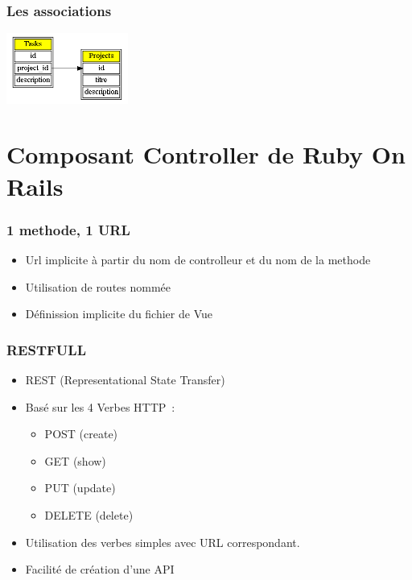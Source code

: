 \documentclass{beamer}
\begin{document}
\begin{frame}
    \frametitle{Les associations}
    \begin{center}
        \includegraphics[width=40mm]{project_task.png}
        
    \end{center}
\end{frame}


\section{Composant Controller de Ruby On Rails}

\begin{frame}
    \frametitle{1 methode, 1 URL}
    \begin{itemize}
        \item Url implicite à partir du nom de controlleur et du nom de la
        methode
        \item Utilisation de routes nommée
        \item Définission implicite du fichier de Vue
    \end{itemize}
\end{frame}

\begin{frame}
    \frametitle{RESTFULL}

    \begin{itemize}
        \item REST (Representational State Transfer)
        \item Basé sur les 4 Verbes HTTP~:
            \begin{itemize}
                \item POST (create)
                \item GET (show)
                \item PUT (update)
                \item DELETE (delete)
            \end{itemize}
        \item Utilisation des verbes simples avec URL correspondant.
        \item Facilité de création d'une API
    \end{itemize}
\end{frame}
\end{document}
